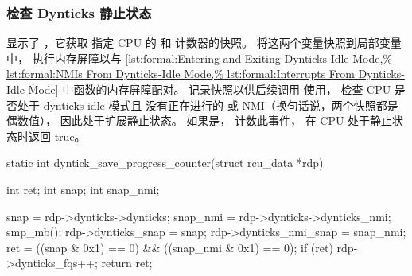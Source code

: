 \subsubsection{检查 Dynticks 静止状态}
\label{sec:formal:Checking For Dynticks Quiescent States}

\begin{fcvref}
显示了 ，它获取
指定 CPU 的  和  计数器的快照。
 将这两个变量快照到局部变量中，
 执行内存屏障以与
\cref{lst:formal:Entering and Exiting Dynticks-Idle Mode,%
lst:formal:NMIs From Dynticks-Idle Mode,%
lst:formal:Interrupts From Dynticks-Idle Mode}
中函数的内存屏障配对。
 记录快照以供后续调用
 使用，
 检查 CPU 是否处于 dynticks-idle 模式且
没有正在进行的 \IRQ 或 NMI（换句话说，两个快照都是偶数值），
因此处于扩展静止状态。
如果是， 计数此事件，
 在 CPU 处于静止状态时返回 true。
\end{fcvref}

\begin{listing}
\begin{fcvlabel}
\begin{VerbatimL}[commandchars=\\\[\]]
static int
dyntick_save_progress_counter(struct rcu_data *rdp)
{
	int ret;
	int snap;
	int snap_nmi;

	snap = rdp->dynticks->dynticks;		\lnlbl[snap]
	snap_nmi = rdp->dynticks->dynticks_nmi;	\lnlbl[snapn]
	smp_mb();				\lnlbl[mb]
	rdp->dynticks_snap = snap;		
	rdp->dynticks_nmi_snap = snap_nmi;	
	ret = ((snap & 0x1) == 0) && ((snap_nmi & 0x1) == 0); 
	if (ret)				\lnlbl[cnt:b]
		rdp->dynticks_fqs++;		\lnlbl[cnt:e]
	return ret;				\lnlbl[ret]
}
\end{VerbatimL}
\end{fcvlabel}
\caption{保存 Dyntick 进度计数器}
\label{lst:formal:Saving Dyntick Progress Counters}
\end{listing}

